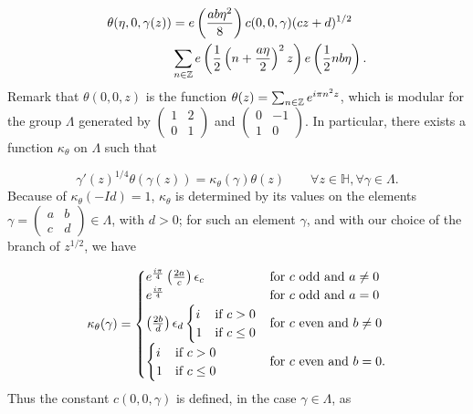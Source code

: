 \documentclass[leqno,10pt]{amsart}
\theoremstyle{plain}
\numberwithin{equation}{section}
\theoremstyle{definition}
\theoremstyle{remark}
\begin{document}
\begin{equation}\label{asymp:eq:lemme:4}
\begin{split}
\theta(\eta,0,\gamma(z)) &= e\left(\frac{ab\eta^2}{8}\right) c(0,0,\gamma) (cz+d)^{1/2} \\
&\sum_{n \in \mathbb{Z}}e\left(\frac{1}{2}\left(n+\frac{a\eta}{2}\right)^2 z\right) e\left(\frac{1}{2}nb\eta\right).
\end{split}
\end{equation}
Remark that $\theta(0,0,z)$ is the function $\theta(z)=\sum_{n\in \mathbb{Z}}e^{i\pi n^2 z}$, which is modular for the group $\Lambda$ generated by $\left(\begin{smallmatrix} 1& 2 \\ 0&1 \end{smallmatrix}\right)$ and $\left(\begin{smallmatrix} 0& -1 \\ 1&0 \end{smallmatrix}\right)$. In particular, there exists a function $\kappa_\theta$ on $\Lambda$ such that 

\begin{equation*}
\gamma'(z)^{1/4} \theta\left(\gamma(z)\right) =\kappa_\theta(\gamma) \theta(z) \qquad \forall z\in \mathbb{H},  \forall \gamma \in \Lambda.
\end{equation*}
Because of $\kappa_\theta(-Id)=1$, $\kappa_\theta$ is determined by its values on the elements $\gamma=\left(\begin{smallmatrix}a&b \\ c&d\end{smallmatrix}\right)\in \Lambda$, with $d>0$; for such an element $\gamma$, and with our choice of the branch of $z^{1/2}$, we have

\begin{equation*}
\kappa_\theta(\gamma) =  \begin{cases}
e^\frac{i\pi}{4} \left(\frac{2a}{c}\right) \epsilon_c   
& \textnormal{for $c$ odd and $a \neq 0$}\\
e^\frac{i\pi}{4}  
& \textnormal{for $c$ odd and $a = 0$}\\
\left(\frac{2b}{d}\right) \epsilon_d 
\begin{cases} i & \textnormal{if }c>0 \\ 1& \textnormal{if } c \le 0 \end{cases}  
& \textnormal{for $c$ even and $b \neq 0$}\\
\begin{cases} i & \textnormal{if }c>0 \\ 1& \textnormal{if } c \le 0 \end{cases}  
& \textnormal{for $c$ even and $b = 0$}.
\end{cases}
\end{equation*}
Thus the constant $c(0,0,\gamma)$ is defined, in the case $\gamma\in\Lambda$, as
\end{document}
